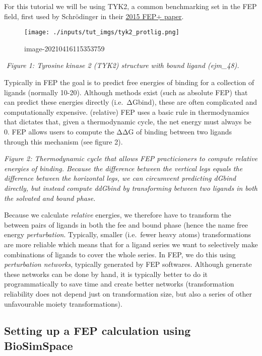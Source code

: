 For this tutorial we will be using TYK2, a common benchmarking set in
the FEP field, first used by Schrödinger in their
\href{https://pubs.acs.org/doi/abs/10.1021/ja512751q}{2015 FEP+ paper}.

\begin{figure}
\centering
\texttt{[image: ./inputs/tut\_imgs/tyk2\_protlig.png]}
\caption{image-20210416115353759}
\end{figure}

​ \emph{Figure 1: Tyrosine kinase 2 (TYK2) structure with bound ligand
(ejm\_48).}

Typically in FEP the goal is to predict free energies of binding for a
collection of ligands (normally 10-20). Although methods exist (such as
absolute FEP) that can predict these energies directly (i.e.~ΔGbind),
these are often complicated and computationally expensive. (relative)
FEP uses a basic rule in thermodynamics that dictates that, given a
thermodynamic cycle, the net energy must always be 0. FEP allows users
to compute the ΔΔG of binding between two ligands through this mechanism
(see figure 2).

\emph{Figure 2: Thermodynamic cycle that allows FEP practicioners to
compute relative energies of binding. Because the difference between the
vertical legs equals the difference between the horizontal legs, we can
circumvent predicting dGbind directly, but instead compute ddGbind by
transforming between two ligands in both the solvated and bound phase.}

Because we calculate \emph{relative} energies, we therefore have to
transform the between pairs of ligands in both the fee and bound phase
(hence the name free energy \emph{perturbation}. Typically, smaller
(i.e.~fewer heavy atoms) transformations are more reliable which means
that for a ligand series we want to selectively make combinations of
ligands to cover the whole series. In FEP, we do this using
\emph{perturbation networks}, typically generated by FEP softwares.
Although generate these networks can be done by hand, it is typically
better to do it programmatically to save time and create better networks
(transformation reliability does not depend just on transformation size,
but also a series of other unfavourable moiety transformations).

\hypertarget{setting-up-a-fep-calculation-using-biosimspace}{%
\subsection{Setting up a FEP calculation using
BioSimSpace}\label{setting-up-a-fep-calculation-using-biosimspace}}

